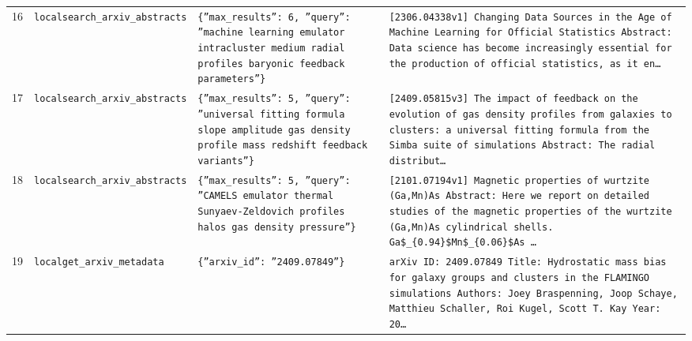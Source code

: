 \documentclass[11pt,a4paper]{article}
\begin{document}
\begin{longtable}{@{}p{}p{}p{}p{}@{}}
16 & \texttt{local}\newline\texttt{search\_\allowbreak{}arxiv\_\allowbreak{}abstracts} & \texttt{\{''max\_\allowbreak{}results'':\allowbreak{} 6,\allowbreak{} ''query'':\allowbreak{} ''machine learning emulator intracluster medium radial profiles baryonic feedback parameters''\}\allowbreak{}} & \texttt{[2306.04338v1]\allowbreak{} Changing Data Sources in the Age of Machine Learning for Official Statistics Abstract:\allowbreak{} Data science has become increasingly essential for the production of official statistics,\allowbreak{} as it en\ldots{}\allowbreak{}} \\
17 & \texttt{local}\newline\texttt{search\_\allowbreak{}arxiv\_\allowbreak{}abstracts} & \texttt{\{''max\_\allowbreak{}results'':\allowbreak{} 5,\allowbreak{} ''query'':\allowbreak{} ''universal fitting formula slope amplitude gas density profile mass redshift feedback variants''\}\allowbreak{}} & \texttt{[2409.05815v3]\allowbreak{} The impact of feedback on the evolution of gas density profiles from galaxies to clusters:\allowbreak{} a universal fitting formula from the Simba suite of simulations Abstract:\allowbreak{} The radial distribut\ldots{}\allowbreak{}} \\
18 & \texttt{local}\newline\texttt{search\_\allowbreak{}arxiv\_\allowbreak{}abstracts} & \texttt{\{''max\_\allowbreak{}results'':\allowbreak{} 5,\allowbreak{} ''query'':\allowbreak{} ''CAMELS emulator thermal Sunyaev-Zeldovich profiles halos gas density pressure''\}\allowbreak{}} & \texttt{[2101.07194v1]\allowbreak{} Magnetic properties of wurtzite (Ga,\allowbreak{}Mn)\allowbreak{}As Abstract:\allowbreak{} Here we report on detailed studies of the magnetic properties of the wurtzite (Ga,\allowbreak{}Mn)\allowbreak{}As cylindrical shells. Ga\$\_\allowbreak{}\{0.94\}\allowbreak{}\$Mn\$\_\allowbreak{}\{0.06\}\allowbreak{}\$As \ldots{}\allowbreak{}} \\
19 & \texttt{local}\newline\texttt{get\_\allowbreak{}arxiv\_\allowbreak{}metadata} & \texttt{\{''arxiv\_\allowbreak{}id'':\allowbreak{} ''2409.07849''\}\allowbreak{}} & \texttt{arXiv ID:\allowbreak{} 2409.07849 Title:\allowbreak{} Hydrostatic mass bias for galaxy groups and clusters in the FLAMINGO simulations Authors:\allowbreak{} Joey Braspenning,\allowbreak{} Joop Schaye,\allowbreak{} Matthieu Schaller,\allowbreak{} Roi Kugel,\allowbreak{} Scott T. Kay Year:\allowbreak{} 20\ldots{}\allowbreak{}} \\

\end{longtable}
\end{document}
